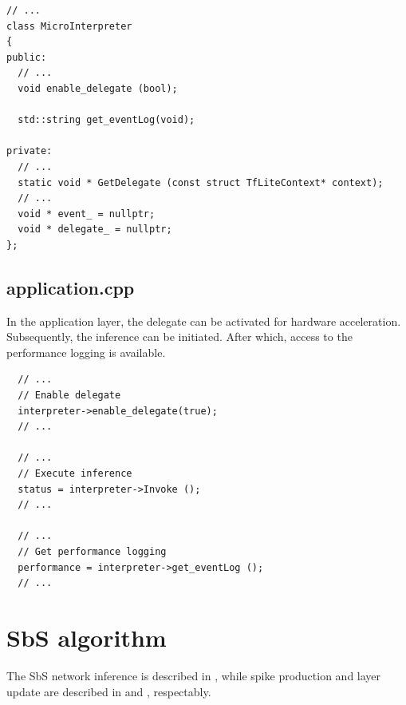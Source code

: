 \begin{lstlisting}
// ...
class MicroInterpreter
{
public:
  // ...
  void enable_delegate (bool);

  std::string get_eventLog(void);

private:
  // ...
  static void * GetDelegate (const struct TfLiteContext* context);
  // ...
  void * event_ = nullptr;
  void * delegate_ = nullptr;
};
\end{lstlisting}

\subsection*{application.cpp}
In the application layer, the delegate can be activated for hardware acceleration. Subsequently, the inference can be initiated. After which, access to the performance logging is available.
\begin{lstlisting}
  // ...
  // Enable delegate
  interpreter->enable_delegate(true);
  // ...

  // ...
  // Execute inference
  status = interpreter->Invoke ();
  // ...
  
  // ...
  // Get performance logging
  performance = interpreter->get_eventLog ();
  // ...
\end{lstlisting}


\FloatBarrier
\section{SbS algorithm}
\label{chap:appendix}
The SbS network inference is described in , while spike production and layer update are described in  and , respectably.

